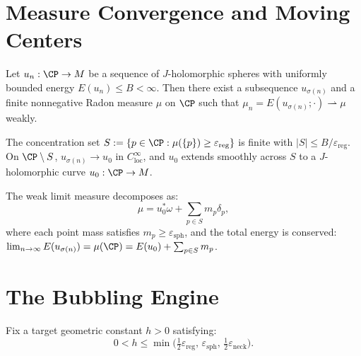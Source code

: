 \section{Measure Convergence and Moving Centers}

\begin{theorem}
\label{c01:weak_measures}
Let $u_n : \CP \to M$ be a sequence of $J$-holomorphic spheres with uniformly bounded energy $E(u_n) \le B < \infty$. Then there exist a subsequence $u_{\sigma(n)}$ and a finite nonnegative Radon measure $\mu$ on $\CP$ such that $\mu_n = E(u_{\sigma(n)}; \cdot) \rightharpoonup \mu$ weakly.
\end{theorem}

\begin{theorem}
\label{c02:concentration_data}
The concentration set $S := \{p \in \CP : \mu(\{p\}) \ge \varepsilon_{\mathrm{reg}}\}$ is finite with $|S| \le B / \varepsilon_{\mathrm{reg}}$. On $\CP \setminus S$, $u_{\sigma(n)} \to u_0$ in $C^\infty_{\mathrm{loc}}$, and $u_0$ extends smoothly across $S$ to a $J$-holomorphic curve $u_0 : \CP \to M$.
\end{theorem}

\begin{theorem}
\label{c03:defect_identity}
The weak limit measure decomposes as:
\[
\mu = u_0^* \omega + \sum_{p \in S} m_p \delta_p,
\]
where each point mass satisfies $m_p \ge \varepsilon_{\mathrm{sph}}$, and the total energy is conserved: $\lim_{n \to \infty} E(u_{\sigma(n)}) = \mu(\CP) = E(u_0) + \sum_{p \in S} m_p$.
\end{theorem}

\section{The Bubbling Engine}

\begin{definition}
\label{b01:threshold_h}
\leanok
{}
Fix a target geometric constant $h > 0$ satisfying:
\[
0 < h \le \min\big(\tfrac{1}{2}\varepsilon_{\mathrm{reg}}, \, \varepsilon_{\mathrm{sph}}, \, \tfrac{1}{2}\varepsilon_{\mathrm{neck}}\big).
\]
\end{definition}

